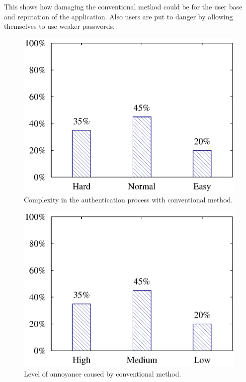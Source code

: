This shows how damaging the conventional method could be for the user base and reputation of the application. Also users are put to danger by allowing themselves to use weaker passwords.

\begin{figure}[H]
\centering
\includegraphics[scale=.7]{files/question3/question3.eps}
\caption{Complexity in the authentication process with conventional method.}
\label{fig:digraph}
\end{figure}

\begin{figure}[H]
\centering
\includegraphics[scale=.7]{files/question4/question4.eps}
\caption{Level of annoyance caused by conventional method.}
\label{fig:digraph}
\end{figure}

